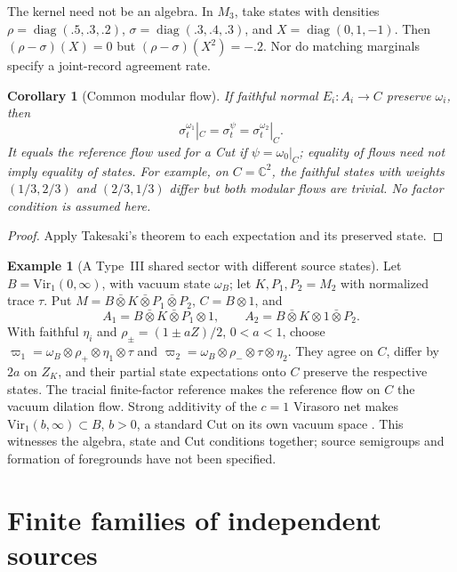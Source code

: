 \documentclass[12pt]{article}
\newtheorem{corollary}[theorem]{Corollary}
\theoremstyle{definition}
\newtheorem{example}[theorem]{Example}
\theoremstyle{remark}
\begin{document}
The kernel need not be an algebra. In \(M_3\), take states with
densities \(\rho=\operatorname{diag}(.5,.3,.2)\),
\(\sigma=\operatorname{diag}(.3,.4,.3)\), and
\(X=\operatorname{diag}(0,1,-1)\). Then
\((\rho-\sigma)(X)=0\) but \((\rho-\sigma)(X^2)=-.2\).
Nor do matching marginals specify a joint-record agreement rate.

\begin{corollary}[Common modular flow]\label{cor:sharedflow}
If faithful normal \(E_i:A_i\to C\) preserve \(\omega_i\), then
\[
 \sigma_t^{\omega_1}|_C=\sigma_t^\psi=\sigma_t^{\omega_2}|_C .
\]
It equals the reference flow used for a Cut if
\(\psi=\omega_0|_C\); equality of flows need not imply equality of states.
For example, on \(C=\mathbb C^2\), the faithful states with weights
\((1/3,2/3)\) and \((2/3,1/3)\) differ but both modular flows are
trivial. No factor condition is assumed here.
\end{corollary}
\begin{proof}
Apply Takesaki's theorem to each expectation and its preserved state.
\end{proof}

\begin{example}[A Type~III shared sector with different source states]
Let \(B=\mathrm{Vir}_1(0,\infty)\), with vacuum state \(\omega_B\);
let \(K,P_1,P_2=M_2\) with normalized trace \(\tau\). Put
\(M=B\bar\otimes K\bar\otimes P_1\bar\otimes P_2\),
\(C=B\otimes1\), and
\[
 A_1=B\bar\otimes K\bar\otimes P_1\otimes1,\qquad
 A_2=B\bar\otimes K\otimes1\bar\otimes P_2 .
\]
With faithful \(\eta_i\) and \(\rho_\pm=(1\pm aZ)/2\), \(0<a<1\),
choose
\(\varpi_1=\omega_B\otimes\rho_+\otimes\eta_1\otimes\tau\) and
\(\varpi_2=\omega_B\otimes\rho_-\otimes\tau\otimes\eta_2\).
They agree on \(C\), differ by \(2a\) on \(Z_K\), and their partial
state expectations onto \(C\) preserve the respective states.
The tracial finite-factor reference makes the reference flow on \(C\)
the vacuum dilation flow. Strong additivity of the \(c=1\) Virasoro net
makes \(\mathrm{Vir}_1(b,\infty)\subset B\), \(b>0\), a standard Cut
on its own vacuum space \cite{FoundationI,PaperI}.
This witnesses the algebra, state and Cut conditions together; source
semigroups and formation of foregrounds have not been specified.
\end{example}

\section{Finite families of independent sources}\label{sec:nsource}
\end{document}
